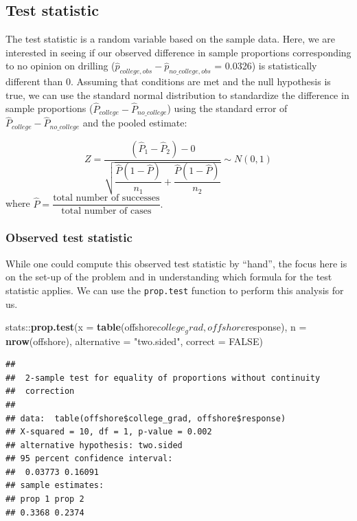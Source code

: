 \documentclass[]{tufte-book}
\newenvironment{Shaded}{\begin{snugshade}}{\end{snugshade}}
\newcommand{\KeywordTok}[1]{\textcolor[rgb]{0.13,0.29,0.53}{\textbf{{#1}}}}
\newcommand{\DataTypeTok}[1]{\textcolor[rgb]{0.13,0.29,0.53}{{#1}}}
\newcommand{\StringTok}[1]{\textcolor[rgb]{0.31,0.60,0.02}{{#1}}}
\newcommand{\OtherTok}[1]{\textcolor[rgb]{0.56,0.35,0.01}{{#1}}}
\newcommand{\NormalTok}[1]{{#1}}
\begin{document}
\subsection{Test statistic}\label{test-statistic-2}

The test statistic is a random variable based on the sample data. Here,
we are interested in seeing if our observed difference in sample
proportions corresponding to no opinion on drilling
(\(\hat{p}_{college, obs} - \hat{p}_{no\_college, obs}\) = 0.0326) is
statistically different than 0. Assuming that conditions are met and the
null hypothesis is true, we can use the standard normal distribution to
standardize the difference in sample proportions
(\(\hat{P}_{college} - \hat{P}_{no\_college}\)) using the standard error
of \(\hat{P}_{college} - \hat{P}_{no\_college}\) and the pooled
estimate:

\[ Z =\dfrac{ (\hat{P}_1 - \hat{P}_2) - 0}{\sqrt{\dfrac{\hat{P}(1 - \hat{P})}{n_1} + \dfrac{\hat{P}(1 - \hat{P})}{n_2} }} \sim N(0, 1) \]
where
\(\hat{P} = \dfrac{\text{total number of successes} }{ \text{total number of cases}}.\)

\subsubsection{Observed test statistic}\label{observed-test-statistic-2}

While one could compute this observed test statistic by ``hand'', the
focus here is on the set-up of the problem and in understanding which
formula for the test statistic applies. We can use the
\texttt{prop.test} function to perform this analysis for us.

\begin{Shaded}
\begin{Highlighting}[]
\NormalTok{stats::}\KeywordTok{prop.test}\NormalTok{(}\DataTypeTok{x =} \KeywordTok{table}\NormalTok{(offshore$college_grad, offshore$response),}
       \DataTypeTok{n =} \KeywordTok{nrow}\NormalTok{(offshore),}
       \DataTypeTok{alternative =} \StringTok{"two.sided"}\NormalTok{,}
       \DataTypeTok{correct =} \OtherTok{FALSE}\NormalTok{)}
\end{Highlighting}
\end{Shaded}

\begin{verbatim}
## 
##  2-sample test for equality of proportions without continuity
##  correction
## 
## data:  table(offshore$college_grad, offshore$response)
## X-squared = 10, df = 1, p-value = 0.002
## alternative hypothesis: two.sided
## 95 percent confidence interval:
##  0.03773 0.16091
## sample estimates:
## prop 1 prop 2 
## 0.3368 0.2374
\end{verbatim}
\end{document}
